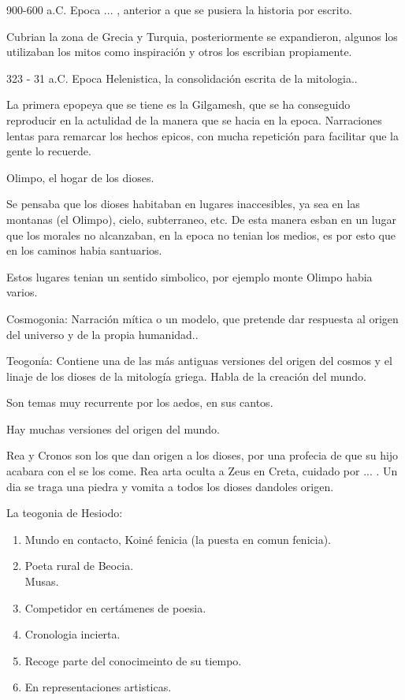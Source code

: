 \documentclass[12pt, twoside, openright]{report} %
\begin{document}
900-600 a.C. Epoca ... , anterior a que se pusiera la historia por escrito.

Cubrian la zona de Grecia y Turquia, posteriormente se expandieron, algunos los utilizaban los mitos como inspiración y otros los escribian propiamente.

323 - 31 a.C. Epoca Helenistica, la consolidación escrita de la mitologia..

La primera epopeya que se tiene es la Gilgamesh, que se ha conseguido reproducir en la actulidad de la manera que se hacia en la epoca. Narraciones lentas para remarcar los hechos epicos, con mucha repetición para facilitar que la gente lo recuerde.



Olimpo, el hogar de los dioses.

Se pensaba que los dioses habitaban en lugares inaccesibles, ya sea en las montanas (el Olimpo), cielo, subterraneo, etc. De esta manera esban en un lugar que los morales no alcanzaban, en la epoca no tenian los medios, es por esto que en los caminos habia santuarios.

Estos lugares tenian un sentido simbolico, por ejemplo monte Olimpo habia varios.




Cosmogonia: Narración mítica o un modelo, que pretende dar respuesta al origen del universo y de la propia humanidad..

Teogonía: Contiene una de las más antiguas versiones del origen del cosmos y el linaje de los dioses de la mitología griega. Habla de la creación del mundo.

Son temas muy recurrente por los aedos, en sus cantos.

Hay muchas versiones del origen del mundo.

Rea y Cronos son los que dan origen a los dioses, por una profecia de que su hijo acabara con el se los come. Rea arta oculta a Zeus en Creta, cuidado por ... . Un dia se traga una piedra y vomita a todos los dioses dandoles origen.

La teogonia de Hesiodo:
\begin{enumerate}
  \item Mundo en contacto, Koiné fenicia (la puesta en comun fenicia).
  \item Poeta rural de Beocia. \\ Musas.
  \item Competidor en certámenes de poesia.
  \item Cronologia incierta.
  \item Recoge parte del conocimeinto de su tiempo.
  \item En representaciones artisticas.
\end{enumerate}
\end{document}
